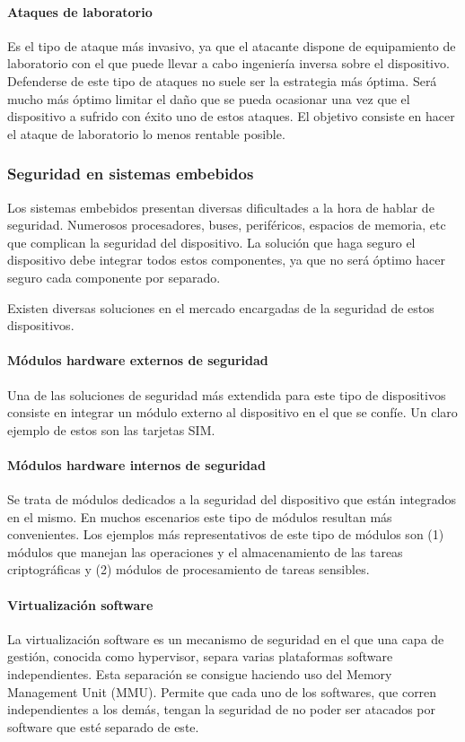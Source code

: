 \paragraph{Ataques de laboratorio}
Es el tipo de ataque más invasivo, ya que el atacante dispone de equipamiento de laboratorio con el que puede llevar a cabo ingeniería inversa sobre el dispositivo. Defenderse de este tipo de ataques no suele ser la estrategia más óptima. Será mucho más óptimo limitar el daño que se pueda ocasionar una vez que el dispositivo a sufrido con éxito uno de estos ataques. El objetivo consiste en hacer el ataque de laboratorio lo menos rentable posible.

\subsubsection{Seguridad en sistemas embebidos}
Los sistemas embebidos presentan diversas dificultades a la hora de hablar de seguridad. Numerosos procesadores, buses, periféricos, espacios de memoria, etc que complican la seguridad del dispositivo. La solución que haga seguro el dispositivo debe integrar todos estos componentes, ya que no será óptimo hacer seguro cada componente por separado. \newline

Existen diversas soluciones en el mercado encargadas de la seguridad de estos dispositivos.

\paragraph{Módulos hardware externos de seguridad}
Una de las soluciones de seguridad más extendida para este tipo de dispositivos consiste en integrar un módulo externo al dispositivo en el que se confíe. Un claro ejemplo de estos son las tarjetas SIM.

\paragraph{Módulos hardware internos de seguridad}
Se trata de módulos dedicados a la seguridad del dispositivo que están integrados en el mismo. En muchos escenarios este tipo de módulos resultan más convenientes. Los ejemplos más representativos de este tipo de módulos son (1) módulos que manejan las operaciones y el almacenamiento de las tareas criptográficas y (2) módulos de procesamiento de tareas sensibles.

\paragraph{Virtualización software}
La virtualización software es un mecanismo de seguridad en el que una capa de gestión, conocida como hypervisor, separa varias plataformas software independientes. Esta separación se consigue haciendo uso del Memory Management Unit (MMU). Permite que cada uno de los softwares, que corren independientes a los demás, tengan la seguridad de no poder ser atacados por software que esté separado de este.


